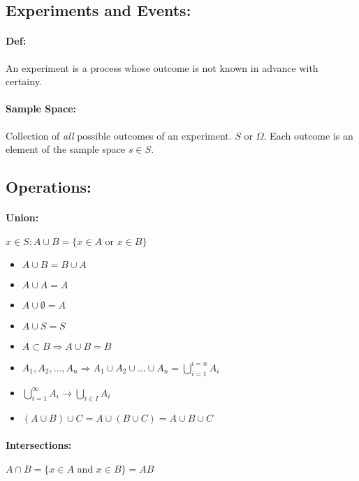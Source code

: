 \documentclass{article}[10pt]
\begin{document}
\begin{multicols}{2}
    \subsection*{Experiments and Events:}
        \paragraph*{Def:} 
            An experiment is a process whose outcome is not known in advance with certainy.

        \paragraph*{Sample Space: } 
            Collection of \textit{all} possible outcomes of an experiment. $S$ or $\Omega$. Each outcome is an element of the sample space $s \in S$.

    \subsection*{Operations: }
        \paragraph*{Union: } 
            \( x \in S: A \cup B = \{x \in A \text{ or } x \in B\}\)
            
            \begin{itemize}
                \item[] \(A \cup B = B \cup A \)
                \item[] \(A \cup A = A \)
                \item[] \(A \cup \emptyset = A \)
                \item[] \(A \cup S = S \)
                \item[] \(A \subset B \Rightarrow A \cup B = B\)
                \item[] \(A_1, A_2, \dots, A_n \Rightarrow A_1 \cup A_2 \cup \dots \cup A_n = \bigcup\limits_{i=1}^{i=n} A_i\)
                \item[] \(\bigcup\limits_{i=1}^{\infty} A_i \rightarrow \bigcup\limits_{i\in I}A_i \)
                \item[] \( (A \cup B) \cup C = A \cup (B \cup C) = A \cup B \cup C \)
            \end{itemize}

        \paragraph*{Intersections: } 
            \( A \cap B = \{ x \in A \text{ and } x \in B\} = AB \)            
            

\end{multicols}
\end{document}
